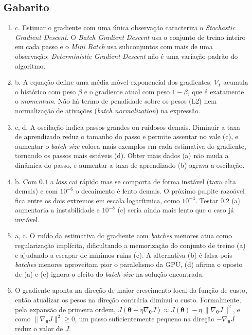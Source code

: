 \documentclass{dlproblemset}
\begin{document}
\subsection*{Gabarito}
\color{blue}
\begin{enumerate}[1)]

    \item c. Estimar o gradiente com uma única observação caracteriza o \textit{Stochastic Gradient Descent}. O \textit{Batch Gradient Descent} usa o conjunto de treino inteiro em cada passo e o \textit{Mini Batch} usa subconjuntos com mais de uma observação; \textit{Deterministic Gradient Descent} não é uma variação padrão do algoritmo.

    \item b. A equação define uma média móvel exponencial dos gradientes: $\mathcal{V}_t$ acumula o histórico com peso $\beta$ e o gradiente atual com peso $1-\beta$, que é exatamente o \textit{momentum}. Não há termo de penalidade sobre os pesos (L2) nem normalização de ativações (\textit{batch normalization}) na expressão.

    \item c, d. A oscilação indica passos grandes ou ruidosos demais. Diminuir a taxa de aprendizado reduz o tamanho do passo e permite assentar no vale (c), e aumentar o \textit{batch size} coloca mais exemplos em cada estimativa do gradiente, tornando os passos mais estáveis (d). Obter mais dados (a) não muda a dinâmica do passo, e aumentar a taxa de aprendizado (b) agrava a oscilação.

    \item b. Com $0.1$ a \textit{loss} cai rápido mas se comporta de forma instável (taxa alta demais) e com $10^{-6}$ o decaimento é lento demais. O próximo palpite razoável fica entre os dois extremos em escala logarítmica, como $10^{-4}$. Testar $0.2$ (a) aumentaria a instabilidade e $10^{-8}$ (c) seria ainda mais lento que o caso já inviável.

    \item a, c. O ruído da estimativa do gradiente com \textit{batches} menores atua como regularização implícita, dificultando a memorização do conjunto de treino (a) e ajudando a escapar de mínimos ruins (c). A alternativa (b) é falsa pois \textit{batches} menores aproveitam pior o paralelismo da GPU, (d) afirma o oposto de (a) e (e) ignora o efeito do \textit{batch size} na solução encontrada.

    \item O gradiente aponta na direção de maior crescimento local da função de custo, então atualizar os pesos na direção contrária diminui o custo. Formalmente, pela expansão de primeira ordem, $J(\boldsymbol{\theta} - \eta\nabla_{\boldsymbol{\theta}} J) \approx J(\boldsymbol{\theta}) - \eta\,\|\nabla_{\boldsymbol{\theta}} J\|^2$, e como $\|\nabla_{\boldsymbol{\theta}} J\|^2 \geq 0$, um passo suficientemente pequeno na direção $-\nabla_{\boldsymbol{\theta}} J$ reduz o valor de $J$.


\end{enumerate}
\end{document}
